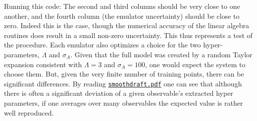 \documentclass[UserManual.tex]{subfiles}
\begin{document}
\begin{sloppypar}
Running this code:
\vspace*{-8pt}
The second and third columns should be very close to one another, and the fourth column (the emulator uncertainty) should be close to zero. Indeed this is the case, though the numerical accuracy of the linear algebra routines does result in a small non-zero uncertainty. This thus represents a test of the procedure. Each emulator also optimizes a choice for the two hyper-parameters, $\Lambda$ and $\sigma_A$. Given that the full model was created by a random Taylor expansion consistent with $\Lambda=3$ and $\sigma_A=100$, one would expect the system to choose them. But, given the very finite number of training points, there can be significant differences. By reading \href{smoothdraft.pdf}{\tt smoothdraft.pdf} one can see that although there is often a significant deviation of a given observable's extracted hyper parameters, if one averages over many observables the expected value is rather well reproduced.


\end{sloppypar}
\end{document}
